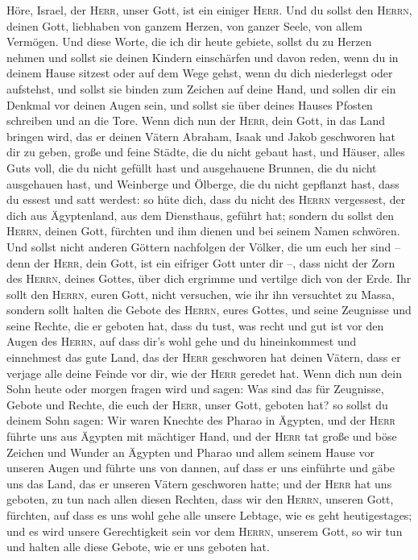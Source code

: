 Höre, Israel, der \textsc{Herr}, unser Gott, ist ein
einiger \textsc{Herr}.  Und du sollst den \textsc{Herrn},
deinen Gott, liebhaben von ganzem Herzen, von ganzer Seele, von allem
Vermögen.  Und diese Worte, die ich dir heute gebiete,
sollst du zu Herzen nehmen  und sollst sie deinen Kindern
einschärfen und davon reden, wenn du in deinem Hause sitzest oder auf
dem Wege gehst, wenn du dich niederlegst oder aufstehst, 
und sollst sie binden zum Zeichen auf deine Hand, und sollen dir ein
Denkmal vor deinen Augen sein,  und sollst sie über deines
Hauses Pfosten schreiben und an die Tore.  Wenn dich nun
der \textsc{Herr}, dein Gott, in das Land bringen wird, das er deinen
Vätern Abraham, Isaak und Jakob geschworen hat dir zu geben, große und
feine Städte, die du nicht gebaut hast,  und Häuser,
alles Guts voll, die du nicht gefüllt hast und ausgehauene Brunnen, die
du nicht ausgehauen hast, und Weinberge und Ölberge, die du nicht
gepflanzt hast, dass du essest und satt werdest:  so hüte
dich, dass du nicht des \textsc{Herrn} vergessest, der dich aus
Ägyptenland, aus dem Diensthaus, geführt hat;  sondern du
sollst den \textsc{Herrn}, deinen Gott, fürchten und ihm dienen und bei
seinem Namen schwören.  Und sollst nicht anderen Göttern
nachfolgen der Völker, die um euch her sind --  denn der
\textsc{Herr}, dein Gott, ist ein eifriger Gott unter dir --, dass nicht
der Zorn des \textsc{Herrn}, deines Gottes, über dich ergrimme und
vertilge dich von der Erde.  Ihr sollt den
\textsc{Herrn}, euren Gott, nicht versuchen, wie ihr ihn versuchtet zu
Massa,  sondern sollt halten die Gebote des
\textsc{Herrn}, eures Gottes, und seine Zeugnisse und seine Rechte, die
er geboten hat,  dass du tust, was recht und gut ist vor
den Augen des \textsc{Herrn}, auf dass dir's wohl gehe und du
hineinkommest und einnehmest das gute Land, das der \textsc{Herr}
geschworen hat deinen Vätern,  dass er verjage alle deine
Feinde vor dir, wie der \textsc{Herr} geredet hat.  Wenn
dich nun dein Sohn heute oder morgen fragen wird und sagen: Was sind das
für Zeugnisse, Gebote und Rechte, die euch der \textsc{Herr}, unser
Gott, geboten hat?  so sollst du deinem Sohn sagen: Wir
waren Knechte des Pharao in Ägypten, und der \textsc{Herr} führte uns
aus Ägypten mit mächtiger Hand,  und der \textsc{Herr}
tat große und böse Zeichen und Wunder an Ägypten und Pharao und allem
seinem Hause vor unseren Augen  und führte uns von
dannen, auf dass er uns einführte und gäbe uns das Land, das er unseren
Vätern geschworen hatte;  und der \textsc{Herr} hat uns
geboten, zu tun nach allen diesen Rechten, dass wir den \textsc{Herrn},
unseren Gott, fürchten, auf dass es uns wohl gehe alle unsere Lebtage,
wie es geht heutigestages;  und es wird unsere
Gerechtigkeit sein vor dem \textsc{Herrn}, unserem Gott, so wir tun und
halten alle diese Gebote, wie er uns geboten hat.

